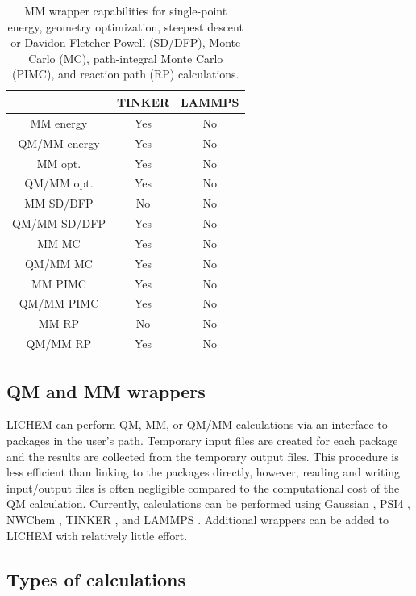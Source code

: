 \documentclass[12pt]{report}
\begin{document}
\begin{table}[hbt]
 \centering
 \begin{tabular}{|c|c c|}
 \hline
  & TINKER & LAMMPS \\ \hline
 MM energy &  Yes & No \\
 QM/MM energy & Yes & No \\ \hline
 MM opt. & Yes & No \\
 QM/MM opt. & Yes & No \\ \hline
 MM SD/DFP & No & No \\
 QM/MM SD/DFP & Yes & No \\ \hline
 MM MC & Yes & No \\
 QM/MM MC & Yes & No \\ \hline
 MM PIMC & Yes & No \\
 QM/MM PIMC & Yes & No \\ \hline
 MM RP & No & No \\
 QM/MM RP & Yes & No \\ \hline
 \end{tabular}
 \caption{
 MM wrapper capabilities for single-point energy, geometry optimization,
 steepest descent or Davidon-Fletcher-Powell (SD/DFP), Monte Carlo (MC),
 path-integral Monte Carlo (PIMC), and reaction path (RP) calculations.}
 \label{tab:MMWrapCap}
\end{table}

\subsection{QM and MM wrappers}

LICHEM can perform QM, MM, or QM/MM calculations via an interface to packages
in the user's path.
Temporary input files are created for each package and the results are
collected from the temporary output files.
This procedure is less efficient than linking to the packages directly,
however, reading and writing input/output files is often negligible compared
to the computational cost of the QM calculation.
Currently, calculations can be performed using Gaussian \cite{Frisch2009},
PSI4 \cite{Turney2012}, 
NWChem \cite{NWChem2010}, 
TINKER \cite{Ponder2015},
and LAMMPS \cite{Plimpton1995}.
Additional wrappers can be added to LICHEM with relatively little effort.

\subsection{Types of calculations}
\end{document}

